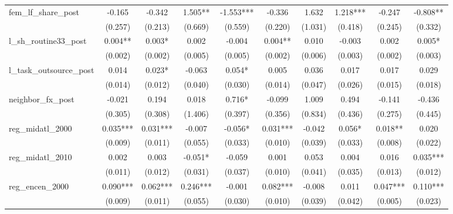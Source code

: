 \begin{table}[htbp]
\begin{tabular}{l*{9}{c}}
\addlinespace
fem\_lf\_share\_post   &   -0.165   &   -0.342   &    1.505** &   -1.553***&   -0.336   &    1.632   &    1.218***&   -0.247   &   -0.808** \\
                    &  (0.257)   &  (0.213)   &  (0.669)   &  (0.559)   &  (0.220)   &  (1.031)   &  (0.418)   &  (0.245)   &  (0.332)   \\
\addlinespace
l\_sh\_routine33\_post &    0.004** &    0.003*  &    0.002   &   -0.004   &    0.004** &    0.010   &   -0.003   &    0.002   &    0.005*  \\
                    &  (0.002)   &  (0.002)   &  (0.005)   &  (0.005)   &  (0.002)   &  (0.006)   &  (0.003)   &  (0.002)   &  (0.003)   \\
\addlinespace
l\_task\_outsource\_post&    0.014   &    0.023*  &   -0.063   &    0.054*  &    0.005   &    0.036   &    0.017   &    0.017   &    0.029   \\
                    &  (0.014)   &  (0.012)   &  (0.040)   &  (0.030)   &  (0.014)   &  (0.047)   &  (0.026)   &  (0.015)   &  (0.018)   \\
\addlinespace
neighbor\_fx\_post    &   -0.021   &    0.194   &    0.018   &    0.716*  &   -0.099   &    1.009   &    0.494   &   -0.141   &   -0.436   \\
                    &  (0.305)   &  (0.308)   &  (1.406)   &  (0.397)   &  (0.356)   &  (0.834)   &  (0.436)   &  (0.275)   &  (0.445)   \\
\addlinespace
reg\_midatl\_2000     &    0.035***&    0.031***&   -0.007   &   -0.056*  &    0.031***&   -0.042   &    0.056*  &    0.018** &    0.020   \\
                    &  (0.009)   &  (0.011)   &  (0.055)   &  (0.033)   &  (0.010)   &  (0.039)   &  (0.033)   &  (0.008)   &  (0.022)   \\
\addlinespace
reg\_midatl\_2010     &    0.002   &    0.003   &   -0.051*  &   -0.059   &    0.001   &    0.053   &    0.004   &    0.016   &    0.035***\\
                    &  (0.011)   &  (0.012)   &  (0.031)   &  (0.037)   &  (0.010)   &  (0.041)   &  (0.035)   &  (0.013)   &  (0.012)   \\
\addlinespace
reg\_encen\_2000      &    0.090***&    0.062***&    0.246***&   -0.001   &    0.082***&   -0.008   &    0.011   &    0.047***&    0.110***\\
                    &  (0.009)   &  (0.011)   &  (0.055)   &  (0.030)   &  (0.010)   &  (0.039)   &  (0.042)   &  (0.005)   &  (0.023)   \\

\end{tabular}
\end{table}
